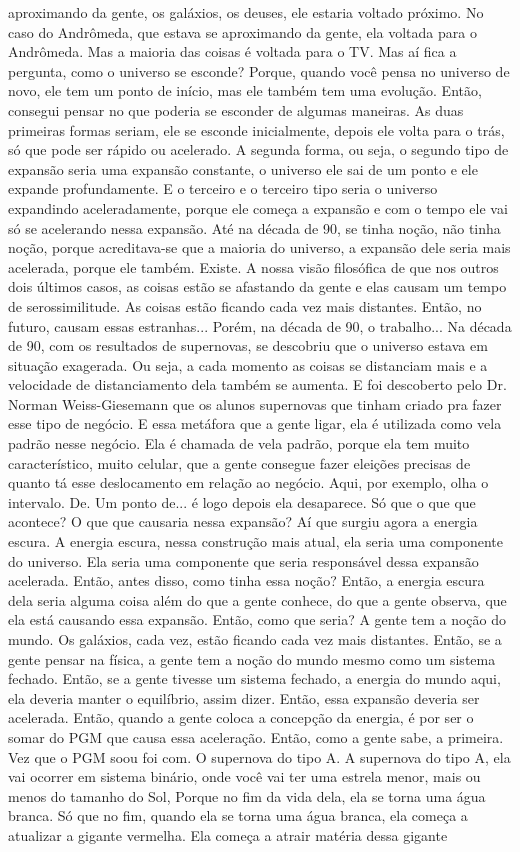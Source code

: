 \documentclass[
	article,			%
	11pt,				%
	twoside,			%
	a4paper,			%
	english,			%
	brazil,				%
	sumario=tradicional
	]{abntex2}
\begin{document}
aproximando da gente, os galáxios, os deuses, ele estaria voltado próximo. No caso do Andrômeda, que estava se aproximando da gente, ela voltada para o Andrômeda. Mas a maioria das coisas é voltada para o TV. Mas aí fica a pergunta, como o universo se esconde? Porque, quando você pensa no universo de novo, ele tem um ponto de início, mas ele também tem uma evolução. Então, consegui pensar no que poderia se esconder de algumas maneiras. As duas primeiras formas seriam, ele se esconde inicialmente, depois ele volta para o trás, só que pode ser rápido ou acelerado. A segunda forma, ou seja, o segundo tipo de expansão seria uma expansão constante, o universo ele sai de um ponto e ele expande profundamente. E o terceiro e o terceiro tipo seria o universo expandindo aceleradamente, porque ele começa a expansão e com o tempo ele vai só se acelerando nessa expansão. Até na década de 90, se tinha noção, não tinha noção, porque acreditava-se que a maioria do universo, a expansão dele seria mais acelerada, porque ele também. Existe. A nossa visão filosófica de que nos outros dois últimos casos, as coisas estão se afastando da gente e elas causam um tempo de serossimilitude. As coisas estão ficando cada vez mais distantes. Então, no futuro, causam essas estranhas... Porém, na década de 90, o trabalho... Na década de 90, com os resultados de supernovas, se descobriu que o universo estava em situação exagerada. Ou seja, a cada momento as coisas se distanciam mais e a velocidade de distanciamento dela também se aumenta. E foi descoberto pelo Dr. Norman Weiss-Giesemann que os alunos supernovas que tinham criado pra fazer esse tipo de negócio. E essa metáfora que a gente ligar, ela é utilizada como vela padrão nesse negócio. Ela é chamada de vela padrão, porque ela tem muito característico, muito celular, que a gente consegue fazer eleições precisas de quanto tá esse deslocamento em relação ao negócio. Aqui, por exemplo, olha o intervalo. De. Um ponto de... é logo depois ela desaparece. Só que o que que acontece? O que que causaria nessa expansão? Aí que surgiu agora a energia escura. A energia escura, nessa construção mais atual, ela seria uma componente do universo. Ela seria uma componente que seria responsável dessa expansão acelerada. Então, antes disso, como tinha essa noção? Então, a energia escura dela seria alguma coisa além do que a gente conhece, do que a gente observa, que ela está causando essa expansão. Então, como que seria? A gente tem a noção do mundo. Os galáxios, cada vez, estão ficando cada vez mais distantes. Então, se a gente pensar na física, a gente tem a noção do mundo mesmo como um sistema fechado. Então, se a gente tivesse um sistema fechado, a energia do mundo aqui, ela deveria manter o equilíbrio, assim dizer. Então, essa expansão deveria ser acelerada. Então, quando a gente coloca a concepção da energia, é por ser o somar do PGM que causa essa aceleração. Então, como a gente sabe, a primeira. Vez que o PGM soou foi com. O supernova do tipo A. A supernova do tipo A, ela vai ocorrer em sistema binário, onde você vai ter uma estrela menor, mais ou menos do tamanho do Sol, Porque no fim da vida dela, ela se torna uma água branca. Só que no fim, quando ela se torna uma água branca, ela começa a atualizar a gigante vermelha. Ela começa a atrair matéria dessa gigante 
\end{document}
